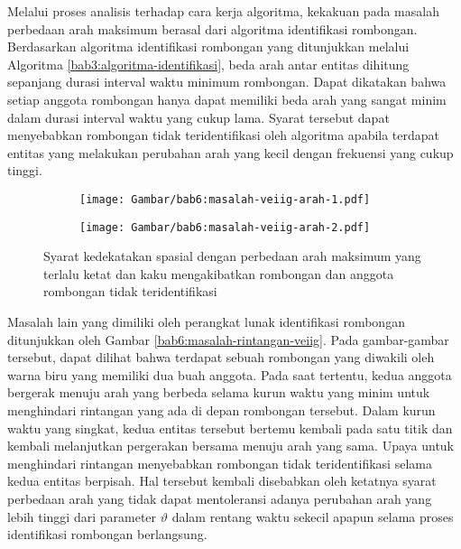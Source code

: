 Melalui proses analisis terhadap cara kerja algoritma, kekakuan pada masalah perbedaan arah maksimum berasal dari algoritma identifikasi rombongan. Berdasarkan algoritma identifikasi rombongan yang ditunjukkan melalui Algoritma \ref{bab3:algoritma-identifikasi}, beda arah antar entitas dihitung sepanjang durasi interval waktu minimum rombongan. Dapat dikatakan bahwa setiap anggota rombongan hanya dapat memiliki beda arah yang sangat minim dalam durasi interval waktu yang cukup lama. Syarat tersebut dapat menyebabkan rombongan tidak teridentifikasi oleh algoritma apabila terdapat entitas yang melakukan perubahan arah yang kecil dengan frekuensi yang cukup tinggi.

\begin{figure}[b!]
    \centering
    \captionsetup{width=.75\textwidth}
    \begin{subfigure}[b]{0.25\textwidth}
        \centering
        \texttt{[image: Gambar/bab6:masalah-veiig-arah-1.pdf]}
    \end{subfigure}
    \begin{subfigure}[b]{0.25\textwidth}
        \centering
        \texttt{[image: Gambar/bab6:masalah-veiig-arah-2.pdf]}
    \end{subfigure}
    \caption[Masalah perbedaan arah maksimum pada data VEIIG]{Syarat kedekatakan spasial dengan perbedaan arah maksimum yang terlalu ketat dan kaku mengakibatkan rombongan dan anggota rombongan tidak teridentifikasi}
    \label{bab6:masalah-veiig-arah}
\end{figure}

Masalah lain yang dimiliki oleh perangkat lunak identifikasi rombongan ditunjukkan oleh Gambar \ref{bab6:masalah-rintangan-veiig}. Pada gambar-gambar tersebut, dapat dilihat bahwa terdapat sebuah rombongan yang diwakili oleh warna biru yang memiliki dua buah anggota. Pada saat tertentu, kedua anggota bergerak menuju arah yang berbeda selama kurun waktu yang minim untuk menghindari rintangan yang ada di depan rombongan tersebut. Dalam kurun waktu yang singkat, kedua entitas tersebut bertemu kembali pada satu titik dan kembali melanjutkan pergerakan bersama menuju arah yang sama. Upaya untuk menghindari rintangan menyebabkan rombongan tidak teridentifikasi selama kedua entitas berpisah. Hal tersebut kembali disebabkan oleh ketatnya syarat perbedaan arah yang tidak dapat mentoleransi adanya perubahan arah yang lebih tinggi dari parameter $\vartheta$ dalam rentang waktu sekecil apapun selama proses identifikasi rombongan berlangsung.

